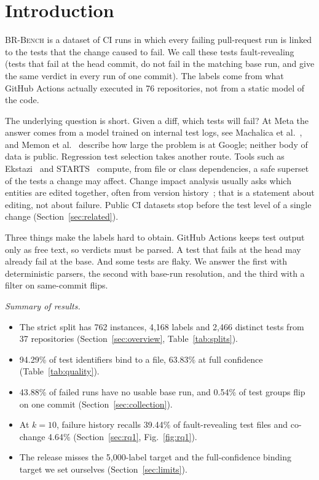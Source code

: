 \documentclass[10pt,conference]{IEEEtran}
\begin{document}
\section{Introduction}

\textsc{BR-Bench} is a dataset of CI runs in which every failing pull-request run is linked to the tests that the change caused to fail. We call these tests fault-revealing (tests that fail at the head commit, do not fail in the matching base run, and give the same verdict in every run of one commit). The labels come from what GitHub Actions actually executed in 76 repositories, not from a static model of the code.

The underlying question is short. Given a diff, which tests will fail? At Meta the answer comes from a model trained on internal test logs, see Machalica et al.~\cite{machalica2019predictive}, and Memon et al.~\cite{memon2017taming} describe how large the problem is at Google; neither body of data is public. Regression test selection takes another route. Tools such as Ekstazi~\cite{gligoric2015practical} and STARTS~\cite{legunsen2017starts} compute, from file or class dependencies, a safe superset of the tests a change may affect. Change impact analysis usually asks which entities are edited together, often from version history~\cite{borg2017supporting,huang2022change}; that is a statement about editing, not about failure. Public CI datasets stop before the test level of a single change (Section~\ref{sec:related}).

Three things make the labels hard to obtain. GitHub Actions keeps test output only as free text, so verdicts must be parsed. A test that fails at the head may already fail at the base. And some tests are flaky. We answer the first with deterministic parsers, the second with base-run resolution, and the third with a filter on same-commit flips.

\textit{Summary of results.}
\begin{itemize}
\item The strict split has 762 instances, 4,168 labels and 2,466 distinct tests from 37 repositories (Section~\ref{sec:overview}, Table~\ref{tab:splits}).
\item 94.29\% of test identifiers bind to a file, 63.83\% at full confidence (Table~\ref{tab:quality}).
\item 43.88\% of failed runs have no usable base run, and 0.54\% of test groups flip on one commit (Section~\ref{sec:collection}).
\item At $k=10$, failure history recalls 39.44\% of fault-revealing test files and co-change 4.64\% (Section~\ref{sec:rq1}, Fig.~\ref{fig:rq1}).
\item The release misses the 5,000-label target and the full-confidence binding target we set ourselves (Section~\ref{sec:limits}).
\end{itemize}
\end{document}
